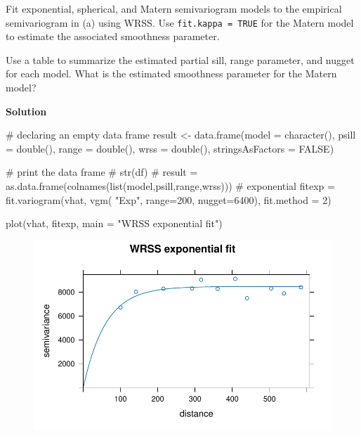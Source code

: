 \documentclass[
  letterpaper,
  DIV=11,
  numbers=noendperiod]{scrartcl}
\newenvironment{Shaded}{\begin{snugshade}}{\end{snugshade}}
\newcommand{\AttributeTok}[1]{\textcolor[rgb]{0.40,0.45,0.13}{#1}}
\newcommand{\CommentTok}[1]{\textcolor[rgb]{0.37,0.37,0.37}{#1}}
\newcommand{\ConstantTok}[1]{\textcolor[rgb]{0.56,0.35,0.01}{#1}}
\newcommand{\DecValTok}[1]{\textcolor[rgb]{0.68,0.00,0.00}{#1}}
\newcommand{\FunctionTok}[1]{\textcolor[rgb]{0.28,0.35,0.67}{#1}}
\newcommand{\NormalTok}[1]{\textcolor[rgb]{0.00,0.23,0.31}{#1}}
\newcommand{\OtherTok}[1]{\textcolor[rgb]{0.00,0.23,0.31}{#1}}
\newcommand{\StringTok}[1]{\textcolor[rgb]{0.13,0.47,0.30}{#1}}
\begin{document}
Fit exponential, spherical, and Matern semivariogram models to the
empirical semivariogram in (a) using WRSS. Use
\texttt{fit.kappa\ =\ TRUE} for the Matern model to estimate the
associated smoothness parameter.

Use a table to summarize the estimated partial sill, range parameter,
and nugget for each model. What is the estimated smoothness parameter
for the Matern model?

\textbf{Solution}

\begin{Shaded}
\begin{Highlighting}[]
\CommentTok{\# declaring an empty data frame }
\NormalTok{result }\OtherTok{\textless{}{-}} \FunctionTok{data.frame}\NormalTok{(}\AttributeTok{model =} \FunctionTok{character}\NormalTok{(), }
                 \AttributeTok{psill =} \FunctionTok{double}\NormalTok{(), }
                 \AttributeTok{range =} \FunctionTok{double}\NormalTok{(),}
                 \AttributeTok{wrss =} \FunctionTok{double}\NormalTok{(),}
                 \AttributeTok{stringsAsFactors =} \ConstantTok{FALSE}\NormalTok{) }
  
\CommentTok{\# print the data frame }
\CommentTok{\# str(df)}
\CommentTok{\# result = as.data.frame(colnames(list(\textquotesingle{}model\textquotesingle{},\textquotesingle{}psill\textquotesingle{},\textquotesingle{}range\textquotesingle{},\textquotesingle{}wrss\textquotesingle{})))}
\CommentTok{\# exponential}
\NormalTok{fitexp }\OtherTok{=} \FunctionTok{fit.variogram}\NormalTok{(vhat,}
                       \FunctionTok{vgm}\NormalTok{( }\StringTok{"Exp"}\NormalTok{, }\AttributeTok{range=}\DecValTok{200}\NormalTok{, }\AttributeTok{nugget=}\DecValTok{6400}\NormalTok{),}
                       \AttributeTok{fit.method =} \DecValTok{2}\NormalTok{)}

\FunctionTok{plot}\NormalTok{(vhat, fitexp, }\AttributeTok{main =} \StringTok{"WRSS exponential fit"}\NormalTok{)}
\end{Highlighting}
\end{Shaded}

\begin{figure}[H]

{\centering \includegraphics{geo-hw-spdep_files/figure-pdf/unnamed-chunk-4-1.pdf}

}

\end{figure}
\end{document}
